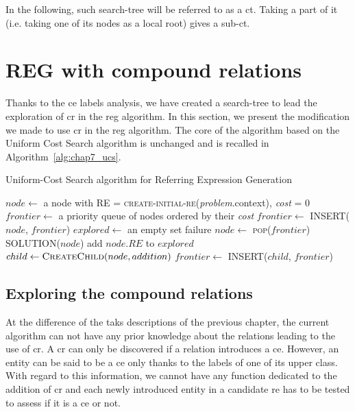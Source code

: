 In the following, such search-tree will be referred to as a \acrfull{ct}. Taking a part of it (i.e. taking one of its nodes as a local root) gives a sub-\acrshort{ct}.

\section{REG with compound relations}

Thanks to the \acrshort{ce} labels analysis, we have created a search-tree to lead the exploration of \acrshort{cr} in the \acrshort{reg} algorithm. In this section, we present the modification we made to use \acrshort{cr} in the \acrshort{reg} algorithm. The core of the algorithm based on the Uniform Cost Search algorithm is unchanged and is recalled in Algorithm~\ref{alg:chap7_ucs}.

\begin{algorithm}[!ht]
\caption{Uniform-Cost Search algorithm for Referring Expression Generation}
\label{alg:chap7_ucs}
\begin{algorithmic}
    \State $node\leftarrow$ a node with RE = \textsc{create-initial-re}(\textit{problem}.context), \textit{cost} = 0
    \State $frontier\leftarrow$ a priority queue of nodes ordered by their \textit{cost}
    \State $frontier\leftarrow$ \textsc{INSERT}($node$, $frontier$)
    \State $explored\leftarrow$ an empty set
    \Loop
        	\State \Return failure
        \EndIf
        \State $node\leftarrow$ \textsc{pop}($frontier$)
        	\State \Return \textsc{SOLUTION}($node$)
        \EndIf
        \State add $node.RE$ to $explored$
            \State $child \leftarrow \textsc{CreateChild}(node, addition)$
            	\State $frontier\leftarrow$ \textsc{INSERT}($child$, $frontier$)
            \EndIf
        \EndFor
    \EndLoop
\EndFunction
\end{algorithmic}
\end{algorithm}

\subsection{Exploring the compound relations}

At the difference of the taks descriptions of the previous chapter, the current algorithm can not have any prior knowledge about the relations leading to the use of \acrshort{cr}. A \acrshort{cr} can only be discovered if a relation introduces a \acrshort{ce}. However, an entity can be said to be a \acrshort{ce} only thanks to the labels of one of its upper class. With regard to this information, we cannot have any function dedicated to the addition of \acrshort{cr} and each newly introduced entity in a candidate \acrshort{re} has to be tested to assess if it is a \acrshort{ce} or not.


